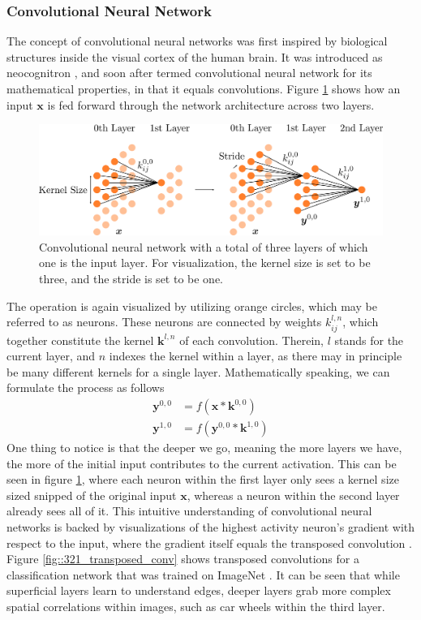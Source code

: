 \subsubsection{Convolutional Neural Network}
The concept of convolutional neural networks was first inspired by biological structures inside the visual cortex of the human brain. It was introduced as neocognitron \cite{fukushima1980neocognitron}, and soon after termed convolutional neural network for its mathematical properties, in that it equals convolutions. Figure \ref{fig::321_convolutional} shows how an input $\bm{x}$ is fed forward through the network architecture across two layers.   
\begin{figure}[h!]
	\centering
	\includegraphics[scale=.28]{chapters/03_background/img/convolutional.png}
	\caption{Convolutional neural network with a total of three layers of which one is the input layer. For visualization, the kernel size is set to be three, and the stride is set to be one.}
	\label{fig::321_convolutional}
\end{figure}
The operation is again visualized by utilizing orange circles, which may be referred to as neurons. These neurons are connected by weights $k^{l,n}_{ij}$, which together constitute the kernel $\bm{k}^{l,n}$ of each convolution. Therein, $l$ stands for the current layer, and $n$ indexes the kernel within a layer, as there may in principle be many different kernels for a single layer. Mathematically speaking, we can formulate the process as follows
\begin{align}
	\bm{y}^{0,0} &= f(\bm{x}*\bm{k}^{0,0}) \\
	\bm{y}^{1,0} &= f(\bm{y}^{0,0}*\bm{k}^{1,0})	
\end{align}
One thing to notice is that the deeper we go, meaning the more layers we have, the more of the initial input contributes to the current activation. This can be seen in figure \ref{fig::321_convolutional}, where each neuron within the first layer only sees a kernel size sized snipped of the original input $\bm{x}$, whereas a neuron within the second layer already sees all of it. This intuitive understanding of convolutional neural networks is backed by visualizations of the highest activity neuron's gradient with respect to the input, where the gradient itself equals the transposed convolution \cite{simonyan2013deep}.  Figure \ref{fig::321_transposed_conv} shows transposed convolutions for a classification network that was trained on ImageNet \cite{deng2009imagenet}. It can be seen that while superficial layers learn to understand edges, deeper layers grab more complex spatial correlations within images, such as car wheels within the third layer.
